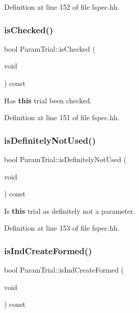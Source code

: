 Definition at line 152 of file fspec.\+hh.

\mbox{\label{class_param_trial_a4ed0aada38fe913da929f7d29e47e61c}} 
\subsubsection{\texorpdfstring{isChecked()}{isChecked()}}
{\footnotesize\ttfamily bool Param\+Trial\+::is\+Checked (\begin{DoxyParamCaption}\item[{void}]{ }\end{DoxyParamCaption}) const\hspace{0.3cm}{\ttfamily [inline]}}



Has {\bfseries{this}} trial been checked. 



Definition at line 151 of file fspec.\+hh.

\mbox{\label{class_param_trial_a55ddad64a188a6513272a284098aea23}} 
\subsubsection{\texorpdfstring{isDefinitelyNotUsed()}{isDefinitelyNotUsed()}}
{\footnotesize\ttfamily bool Param\+Trial\+::is\+Definitely\+Not\+Used (\begin{DoxyParamCaption}\item[{void}]{ }\end{DoxyParamCaption}) const\hspace{0.3cm}{\ttfamily [inline]}}



Is {\bfseries{this}} trial as definitely not a parameter. 



Definition at line 153 of file fspec.\+hh.

\mbox{\label{class_param_trial_a70fbfc1bdd9e76295700b6b45f86f7da}} 
\subsubsection{\texorpdfstring{isIndCreateFormed()}{isIndCreateFormed()}}
{\footnotesize\ttfamily bool Param\+Trial\+::is\+Ind\+Create\+Formed (\begin{DoxyParamCaption}\item[{void}]{ }\end{DoxyParamCaption}) const\hspace{0.3cm}{\ttfamily [inline]}}




